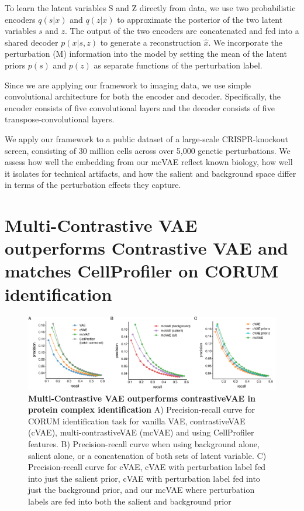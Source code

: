 \documentclass{article}
\begin{document}
To learn the latent variables S and Z directly from data, we use two probabilistic encoders $q(s|x)$ and $q(z|x)$ to approximate the posterior of the two latent variables $s$ and $z$. The output of the two encoders are concatenated and fed into a shared decoder $p(x|s,z)$ to generate a reconstruction $\hat{x}$. We incorporate the perturbation (M) information into the model by setting the mean of the latent priors $p(s)$ and $p(z)$ as separate functions of the perturbation label. 

Since we are applying our framework to imaging data, we use simple convolutional architecture for both the encoder and decoder. Specifically, the encoder consists of five convolutional layers and the decoder consists of five transpose-convolutional layers. 

We apply our framework to a public dataset of a large-scale CRISPR-knockout screen, consisting of 30 million cells across over 5,000 genetic perturbations. We assess how well the embedding from our mcVAE reflect known biology, how well it isolates for technical artifacts, and how the salient and background space differ in terms of the perturbation effects they capture. 

\section*{Multi-Contrastive VAE outperforms Contrastive VAE and matches CellProfiler on CORUM identification
}


\begin{figure}[h!]
    \centering
    \includegraphics[width=\textwidth]{figure/figure_1.png}
    \caption{\textbf{Multi-Contrastive VAE outperforms contrastiveVAE in protein complex identification} 
    A) Precision-recall curve for CORUM identification task for vanilla VAE, contrastiveVAE (cVAE), multi-contrastiveVAE (mcVAE) and using CellProfiler features.
    B) Precision-recall curve when using background alone, salient alone, or a concatenation of both sets of latent variable.
    C) Precision-recall curve for cVAE, cVAE with perturbation label fed into just the salient prior, cVAE with perturbation label fed into just the background prior, and our mcVAE where perturbation labels are fed into both the salient and background prior}
    \label{fig:corum}
\end{figure}
\end{document}
